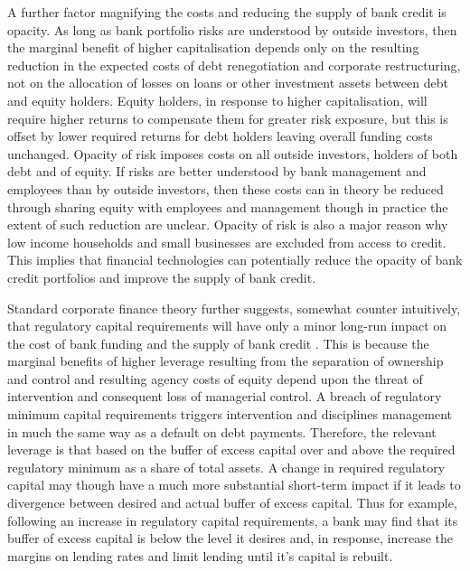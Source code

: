 \documentclass[
]{article}
\begin{document}
A further factor magnifying the costs and reducing the supply of bank credit is opacity. As long as bank portfolio risks are understood by outside investors, then the marginal benefit of higher capitalisation depends only on the resulting reduction in the expected costs of debt renegotiation and corporate restructuring, not on the allocation of losses on loans or other investment assets between debt and equity holders. Equity holders, in response to higher capitalisation, will require higher returns to compensate them for greater risk exposure, but this is offset by lower required returns for debt holders leaving overall funding costs unchanged. Opacity of risk imposes costs on all outside investors, holders of both debt and of equity. If risks are better understood by bank management and employees than by outside investors, then these costs can in theory be reduced through sharing equity with employees and management though in practice the extent of such reduction are unclear. Opacity of risk is also a major reason why low income households and small businesses are excluded from access to credit. This implies that financial technologies can potentially reduce the opacity of bank credit portfolios and improve the supply of bank credit.

Standard corporate finance theory further suggests, somewhat counter intuitively, that regulatory capital requirements will have only a minor long-run impact on the cost of bank funding and the supply of bank credit \citep{brealey2006basel, hellwig2014bankers}. This is because the marginal benefits of higher leverage resulting from the separation of ownership and control and resulting agency costs of equity depend upon the threat of intervention and consequent loss of managerial control. A breach of regulatory minimum capital requirements triggers intervention and disciplines management in much the same way as a default on debt payments. Therefore, the relevant leverage is that based on the buffer of excess capital over and above the required regulatory minimum as a share of total assets. A change in required regulatory capital may though have a much more substantial short-term impact if it leads to divergence between desired and actual buffer of excess capital. Thus for example, following an increase in regulatory capital requirements, a bank may find that its buffer of excess capital is below the level it desires and, in response, increase the margins on lending rates and limit lending until it's capital is rebuilt.
\end{document}
